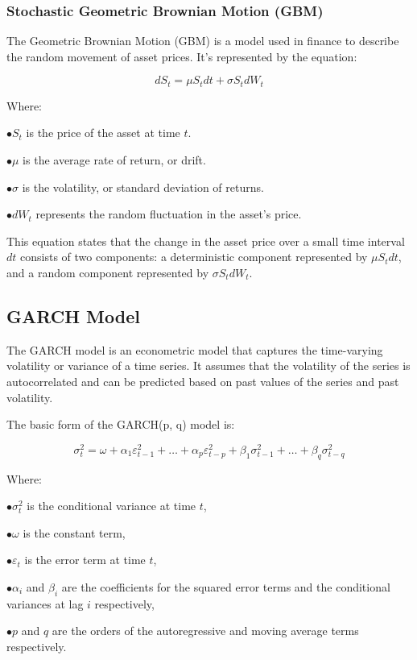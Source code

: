 \subsubsection{Stochastic Geometric Brownian Motion (GBM)}

The Geometric Brownian Motion (GBM) is a model used in finance to describe the random movement of asset prices. It's represented by the equation:

\[
dS_t = \mu S_t dt + \sigma S_t dW_t
\]

Where:

$ \bullet S_t $ is the price of the asset at time $ t $.
 
$ \bullet \mu $ is the average rate of return, or drift.

$ \bullet \sigma $ is the volatility, or standard deviation of returns.

$ \bullet dW_t $ represents the random fluctuation in the asset's price.


This equation states that the change in the asset price over a small time interval \( dt \) consists of two components: a deterministic component represented by \( \mu S_t dt \), and a random component represented by \( \sigma S_t dW_t \).

\subsection{GARCH Model}

The GARCH model is an econometric model that captures the time-varying volatility or variance of a time series. It assumes that the volatility of the series is autocorrelated and can be predicted based on past values of the series and past volatility.

The basic form of the GARCH(p, q) model is:

\[
\sigma_{t}^2 = \omega + \alpha_{1}\varepsilon_{t-1}^2 + \ldots + \alpha_{p}\varepsilon_{t-p}^2 + \beta_{1}\sigma_{t-1}^2 + \ldots + \beta_{q}\sigma_{t-q}^2
\]

Where:

$ \bullet \sigma_{t}^2 $ is the conditional variance at time $ t $,

$ \bullet \omega $ is the constant term,

$ \bullet \varepsilon_{t} $ is the error term at time $ t $,

$ \bullet \alpha_{i} $ and $ \beta_{i} $ are the coefficients for the squared error terms and the conditional variances at lag $ i $ respectively,

$ \bullet p $ and $ q $ are the orders of the autoregressive and moving average terms respectively.

